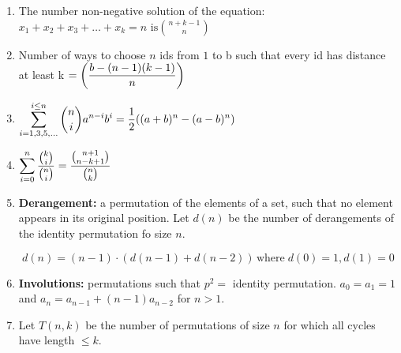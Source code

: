 \begin{enumerate}
    $$
    \displaystyle \frac{n!}{k!^{\frac{n}{k}} \left( \frac{n}{k} \right) !}= \prod \limits_{n \geq k}^{n-=k}{\binom{n-1}{k-1}}
    $$
\item The number non-negative solution of the equation: $\displaystyle x_1+x_2+x_3+ \ldots +x_k=n \text{ is}{\binom{n+k-1}{n}}$
\item Number of ways to choose $n$ ids from $\displaystyle 1$ to b such that every id has distance at least k  $\displaystyle \displaystyle =\left( \frac{b-(n-1)(k-1)}{n} \right)$  
\item $\displaystyle \displaystyle \sum \limits_{i=1,3,5,\dots}^{i\leq n} \binom{n}{i} a^{n-i}b^i = \frac{1}{2} ((a+b)^n-(a-b)^n)$
\item $\displaystyle \displaystyle \sum \limits_{i=0}^{n} \dfrac{\binom{k}{i}}{\binom{n}{i}} = \dfrac{\binom{n+1}{n-k+1}}{\binom{n}{k}}$
\item \textbf{Derangement:} a permutation of the elements of a set, such that no element appears in its original position. Let $d(n)$ be the number of derangements of the identity permutation fo size $n$.
    
    $$d(n)=(n-1) \cdot (d(n-1)+d(n-2)) \, \text{where}\;d(0)=1,d(1)=0$$
\item \textbf{Involutions:} permutations such that $\displaystyle p^2 =$ identity permutation. $\displaystyle a_0 = a_1 = 1$ and $\displaystyle a_n=a_{n-1} + (n-1)a_{n-2}$ for $n>1$.
\item Let $T(n,k)$ be the number of permutations of size $n$ for which all cycles have length $\displaystyle \leq k$.
    

\end{enumerate}

